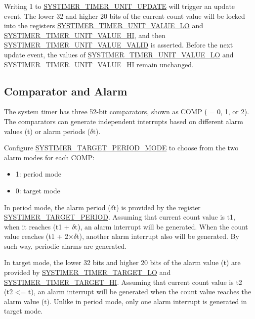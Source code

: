 \documentclass[main\_\_EN.tex]{subfiles}
\begin{document}
Writing 1 to \hyperref[fielddesc:SYSTIMERTIMERUNIT0UPDATE]{SYSTIMER\_TIMER\_UNIT\_UPDATE} will trigger an update event. The lower 32 and higher 20 bits of the current count value will be locked into the registers \hyperref[fielddesc:SYSTIMERTIMERUNIT0VALUELO]{SYSTIMER\_TIMER\_UNIT\_VALUE\_LO} and \hyperref[fielddesc:SYSTIMERTIMERUNIT0VALUEHI]{SYSTIMER\_TIMER\_UNIT\_VALUE\_HI}, and then \hyperref[fielddesc:SYSTIMERTIMERUNIT0VALUEVALID]{SYSTIMER\_TIMER\_UNIT\_VALUE\_VALID} is asserted. Before the next update event, the values of \hyperref[fielddesc:SYSTIMERTIMERUNIT0VALUELO]{SYSTIMER\_TIMER\_UNIT\_VALUE\_LO} and \hyperref[fielddesc:SYSTIMERTIMERUNIT0VALUEHI]{SYSTIMER\_TIMER\_UNIT\_VALUE\_HI} remain unchanged.


\subsection{Comparator and Alarm}
The system timer has three 52-bit comparators, shown as COMP ( = 0, 1, or 2). The comparators can generate independent interrupts based on different alarm values (t) or alarm periods ($\delta$t).

Configure \hyperref[fielddesc:SYSTIMERTARGET0PERIODMODE]{SYSTIMER\_TARGET\_PERIOD\_MODE} to choose from the two alarm modes for each COMP:
\begin{itemize}
    \item 1: period mode
    \item 0: target mode
\end{itemize}

In period mode, the alarm period ($\delta$t) is provided by the register \hyperref[fielddesc:SYSTIMERTARGET2PERIOD]{SYSTIMER\_TARGET\_PERIOD}. Assuming that current count value is t1, when it reaches (t1 + $\delta$t), an alarm interrupt will be generated. When the count value reaches (t1 + 2×$\delta$t), another alarm interrupt also will be generated. By such way, periodic alarms are generated.

In target mode, the lower 32 bits and higher 20 bits of the alarm value (t) are provided by  \hyperref[fielddesc:SYSTIMERTIMERTARGET0LO]{SYSTIMER\_TIMER\_TARGET\_LO} and \hyperref[fielddesc:SYSTIMERTIMERTARGET0HI]{SYSTIMER\_TIMER\_TARGET\_HI}. Assuming that current count value is t2 (t2 <= t), an alarm interrupt will be generated when the count value reaches the alarm value (t). Unlike in period mode, only one alarm interrupt is generated in target mode.
\end{document}
